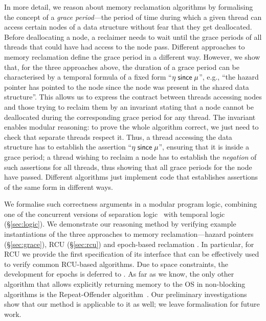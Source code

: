 In more detail, we reason about memory reclamation algorithms by formalising the
concept of a {\em grace period}---the period of time during which a given thread
can access certain nodes of a data structure without fear that they get
deallocated.
Before deallocating a node, a reclaimer needs to wait until the grace periods of
all threads that could have had access to the node pass.  Different approaches
to memory reclamation define the grace period in a different way. However, we
show that, for the three approaches above, the duration of a grace period can be
characterised by a temporal formula of a fixed form ``$\eta \;\mathsf{since}\; \mu$'', e.g.,
``the hazard pointer has pointed to the node since the node was present in the
shared data structure''. This allows us to express the contract between threads
accessing nodes and those trying to reclaim them by an invariant stating that a
node cannot be deallocated during the corresponding grace period for any
thread. The invariant enables modular reasoning: to prove the whole algorithm
correct, we just need to check that separate threads respect it. Thus, a thread
accessing the data structure has to establish the assertion ``$\eta \;\mathsf{since}\;
\mu$'', ensuring that it is inside a grace period; a thread wishing to reclaim a
node has to establish the {\em negation} of such assertions for all threads,
thus showing that all grace periods for the node have passed. Different
algorithms just
implement code that establishes assertions of the same form in different ways.

We formalise such correctness arguments in a modular program logic, combining
one of the concurrent versions of separation logic~\cite{rgsep,sagl} with
temporal logic (\S\ref{sec:logic}). We demonstrate our reasoning method by
verifying example instantiations of the three approaches to memory
reclamation---hazard pointers (\S\ref{sec:grace}), RCU (\S\ref{sec:rcu}) and
epoch-based reclamation \tra{\ref{app:epoch}}{\nepoch}. %
In particular, for RCU we provide the first specification of its interface that
can be effectively used to verify common RCU-based algorithms. Due to space
constraints, the development for epochs is deferred to
\tr{\ref{app:epoch}}{\nepoch}.
As far as we know, the only other algorithm that allows explicitly returning
memory to the OS in non-blocking algorithms is the Repeat-Offender
algorithm~\cite{rop}. Our preliminary investigations show that our method is
applicable to it as well; we leave formalisation for future work.

